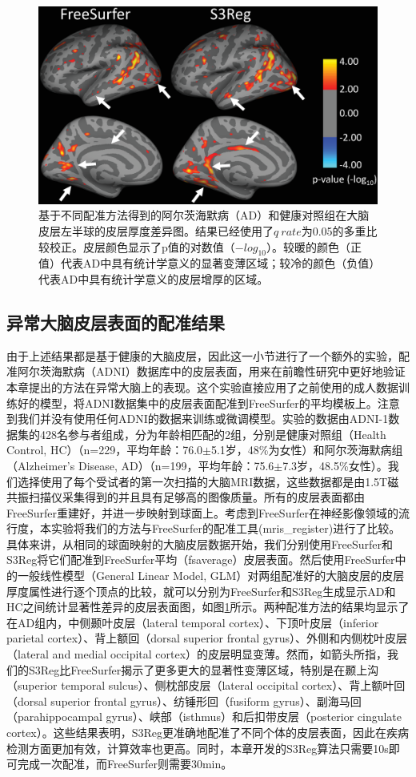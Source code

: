 \begin{figure}[t]
	\centering
	\includegraphics[width=0.8\linewidth]{figure/ADVSHC.eps}
	\caption{基于不同配准方法得到的阿尔茨海默病（AD）和健康对照组在大脑皮层左半球的皮层厚度差异图。结果已经使用了$q~rate$为0.05的多重比较校正。皮层颜色显示了p值的对数值（$-log_{10}$）。较暖的颜色（正值）代表AD中具有统计学意义的显著变薄区域；较冷的颜色（负值）代表AD中具有统计学意义的皮层增厚的区域。}
	\label{fig:ADVSHC}
\end{figure}

\subsection{异常大脑皮层表面的配准结果}
由于上述结果都是基于健康的大脑皮层，因此这一小节进行了一个额外的实验，配准阿尔茨海默病（ADNI）数据库\cite{jack2008alzheimer}中的皮层表面，用来在前瞻性研究中更好地验证本章提出的方法在异常大脑上的表现。这个实验直接应用了之前使用的成人数据训练好的模型，将ADNI数据集中的皮层表面配准到FreeSurfer的平均模板上。注意到我们并没有使用任何ADNI的数据来训练或微调模型。实验的数据由ADNI-1数据集的428名参与者组成，分为年龄相匹配的2组，分别是健康对照组（Health Control, HC）（n=229，平均年龄：76.0$\pm$5.1岁，48\%为女性）和阿尔茨海默病组（Alzheimer's Disease, AD）（n=199，平均年龄：75.6$\pm$7.3岁，48.5\%女性）。我们选择使用了每个受试者的第一次扫描的大脑MRI数据，这些数据都是由1.5T磁共振扫描仪采集得到的并且具有足够高的图像质量。所有的皮层表面都由FreeSurfer重建好\cite{fischl2012freesurfer}，并进一步映射到球面上。考虑到FreeSurfer在神经影像领域的流行度，本实验将我们的方法与FreeSurfer的配准工具(mris\_register)进行了比较。具体来讲，从相同的球面映射的大脑皮层数据开始，我们分别使用FreeSurfer和S3Reg将它们配准到FreeSurfer平均（fsaverage）皮层表面\cite{fischl2012freesurfer}。然后使用FreeSurfer中的一般线性模型（General Linear Model, GLM）对两组配准好的大脑皮层的皮层厚度属性进行逐个顶点的比较，就可以分别为FreeSurfer和S3Reg生成显示AD和HC之间统计显著性差异的皮层表面图，如图\ref{fig:ADVSHC}所示。两种配准方法的结果均显示了在AD组内，中侧颞叶皮层（lateral temporal cortex）、下顶叶皮层（inferior parietal cortex）、背上额回（dorsal superior frontal gyrus）、外侧和内侧枕叶皮层（lateral and medial occipital cortex）的皮层明显变薄。然而，如箭头所指，我们的S3Reg比FreeSurfer揭示了更多更大的显著性变薄区域，特别是在颞上沟（superior temporal sulcus）、侧枕部皮层（lateral occipital cortex）、背上额叶回（dorsal superior frontal gyrus）、纺锤形回（fusiform gyrus）、副海马回（parahippocampal gyrus）、峡部（isthmus）和后扣带皮层（posterior cingulate cortex）。这些结果表明，S3Reg更准确地配准了不同个体的皮层表面，因此在疾病检测方面更加有效，计算效率也更高。同时，本章开发的S3Reg算法只需要10s即可完成一次配准，而FreeSurfer则需要30min。

